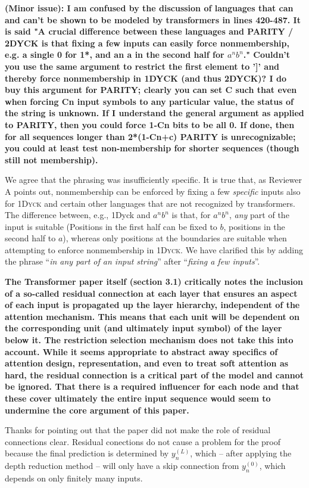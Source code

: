 \documentclass[11pt,a4paper]{article}
\newcommand\response[1]{{\color{blue}#1}}
\newcommand\newtext[1]{``\textit{#1}''}
\newcommand\original[1]{\textbf{#1}}
\begin{document}
\original{(Minor issue): I am confused by the discussion of languages that can and
can't be
shown to be modeled by transformers in lines 420-487. It is said "A
crucial difference between these languages and PARITY / 2DYCK is that
fixing a few inputs can easily force nonmembership, e.g. a single 0
for 1*, and an a in the second half for $a^n b^n$." Couldn't you use the
same argument to restrict the first element to ']' and thereby force
nonmembership in 1DYCK (and thus 2DYCK)? I do buy this
argument for PARITY; clearly you can set C such that even when forcing
Cn input symbols to any particular value, the status of the string is
unknown. If I understand the general argument as applied to PARITY,
then you could force 1-Cn bits to be all 0. If done, then for all
sequences longer than 2*(1-Cn+c) PARITY is unrecognizable; you could
at least test non-membership for shorter sequences (though still not
membership).}

\response{We agree that the phrasing was insufficiently specific. It is true that, as Reviewer A points out, nonmembership can be enforced by fixing a few \emph{specific} inputs also for \textsc{1Dyck} and certain other languages that are not recognized by transformers. The difference between, e.g., 1Dyck and $a^nb^n$ is that, for $a^nb^n$, \emph{any} part of the input is suitable (Positions in the first half can be fixed to $b$, positions in the second half to $a$), whereas only positions at the boundaries are suitable when attempting to enforce nonmembership in \textsc{1Dyck}. We have clarified this by adding the phrase \newtext{in any part of an input string} after \newtext{fixing a few inputs}.}


\original{The Transformer paper itself (section 3.1) critically notes the
inclusion of a so-called residual connection
at each layer that ensures an aspect of each input is propagated up the
layer
hierarchy, independent of the attention mechanism. This means that
each unit will be dependent on the corresponding unit (and ultimately
input symbol) of the layer below it. The restriction selection
mechanism does not take this into account. While it seems appropriate to
abstract away specifics of attention design, representation, and even
to treat soft attention as hard, the residual connection is a critical part
of the model and cannot be ignored. That there is a required
influencer for each node and that these cover ultimately the entire
input sequence would seem to undermine the core argument of this paper.}

\response{Thanks for pointing out that the paper did not make the role of residual connections clear. Residual conections do not cause a problem for the proof because the final prediction is determined by $y_n^{(L)}$, which -- after applying the depth reduction method -- will only have a skip connection from $y_n^{(0)}$, which depends on only finitely many inputs.}
\end{document}
